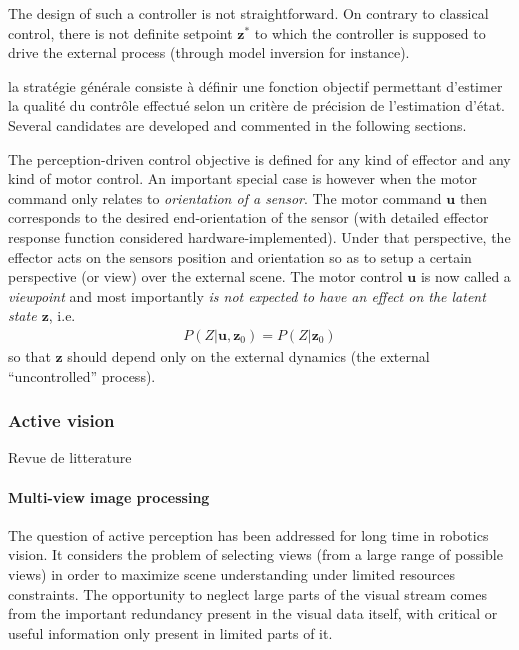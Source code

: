 \documentclass{article}
\begin{document}
The design of such a controller is not straightforward. On contrary to classical control, there is not definite setpoint $\boldsymbol{z}^*$ to which the controller is supposed to drive the external process (through model inversion for instance).

{\color{magenta} la stratégie générale consiste à définir une fonction objectif permettant d'estimer la qualité du contrôle effectué selon un critère de précision de l'estimation d'état}.
Several candidates are developed and commented in the following sections.


{\color{blue} The perception-driven control objective is defined for any kind of effector and any kind of motor control.} An important special case is however when the motor command only relates to \emph{orientation of a sensor}. The motor command $\boldsymbol{u}$ then corresponds to the desired end-orientation of the sensor (with detailed effector response function considered  hardware-implemented).  
Under that perspective, the effector acts on the sensors position and orientation so as to setup a certain perspective (or view) over the external scene. The motor control $\boldsymbol{u}$ is now called a \emph{viewpoint} and most importantly \emph{is not expected to have an effect on the latent state $\boldsymbol{z}$}, i.e.
\begin{align}
P(Z|\boldsymbol{u},\boldsymbol{z}_0) = P(Z|\boldsymbol{z}_0)
\end{align} 
so that $\boldsymbol{z}$ should depend only on the external dynamics (the external ``uncontrolled'' process).



 

\subsubsection{Active vision}

{\color{magenta} Revue de litterature}

\paragraph{Multi-view image processing}

The question of active perception has been addressed for long time in robotics vision. It considers the problem of selecting views (from a large range of possible views) in order to maximize scene understanding under limited resources constraints. The opportunity to neglect large parts of the visual stream comes from the important redundancy present in the visual data itself, with critical or useful information only present in limited parts of it.
\end{document}

